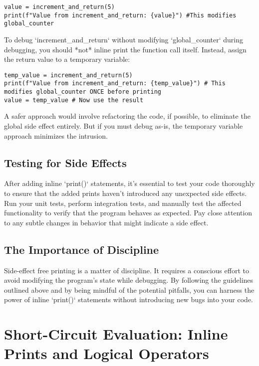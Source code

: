 \documentclass{article}
\begin{document}
{{{{\begin{verbatim}
value = increment_and_return(5)
print(f"Value from increment_and_return: {value}") #This modifies global_counter
\end{verbatim}

To debug `increment_and_return` without modifying `global_counter` during debugging, you should *not* inline print the function call itself. Instead, assign the return value to a temporary variable:
\begin{verbatim}
temp_value = increment_and_return(5)
print(f"Value from increment_and_return: {temp_value}") # This modifies global_counter ONCE before printing
value = temp_value # Now use the result
\end{verbatim}

A safer approach would involve refactoring the code, if possible, to eliminate the global side effect entirely. But if you must debug as-is, the temporary variable approach minimizes the intrusion.

\subsection*{Testing for Side Effects}

After adding inline `print()` statements, it's essential to test your code thoroughly to ensure that the added prints haven't introduced any unexpected side effects.  Run your unit tests, perform integration tests, and manually test the affected functionality to verify that the program behaves as expected.  Pay close attention to any subtle changes in behavior that might indicate a side effect.

\subsection*{The Importance of Discipline}

Side-effect free printing is a matter of discipline. It requires a conscious effort to avoid modifying the program's state while debugging. By following the guidelines outlined above and by being mindful of the potential pitfalls, you can harness the power of inline `print()` statements without introducing new bugs into your code.

\newpage

\section*{Short-Circuit Evaluation: Inline Prints and Logical Operators} %
\label{chapter-6-7-Short-Circuit_Evaluation__Inline_Prints}

}}}}
\end{document}
